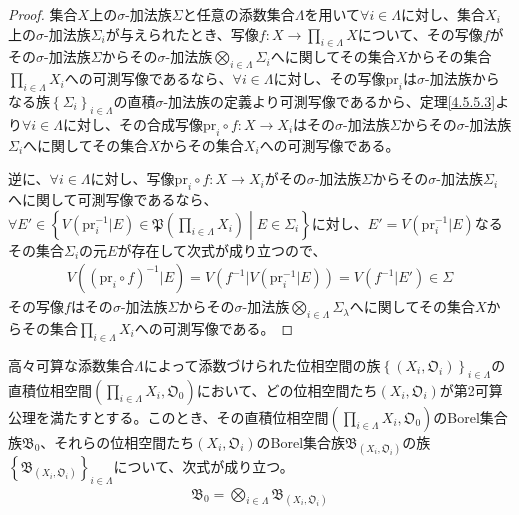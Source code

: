\documentclass[dvipdfmx]{jsarticle}
\begin{document}
\begin{proof}
集合$X$上の$\sigma$-加法族$\varSigma$と任意の添数集合$\varLambda$を用いて$\forall i \in \varLambda$に対し、集合$X_{i}$上の$\sigma$-加法族$\varSigma_{i}$が与えられたとき、写像$f:X \rightarrow \prod_{i \in \varLambda} X$について、その写像$f$がその$\sigma$-加法族$\varSigma$からその$\sigma$-加法族$\bigotimes_{i \in \varLambda} \varSigma_{i}$へに関してその集合$X$からその集合$\prod_{i \in \varLambda} X_{i}$への可測写像であるなら、$\forall i \in \varLambda$に対し、その写像$\mathrm{pr}_{i}$は$\sigma$-加法族からなる族$\left\{ \varSigma_{i} \right\}_{i \in \varLambda}$の直積$\sigma$-加法族の定義より可測写像であるから、定理\ref{4.5.5.3}より$\forall i \in \varLambda$に対し、その合成写像$\mathrm{pr}_{i} \circ f:X \rightarrow X_{i}$はその$\sigma$-加法族$\varSigma$からその$\sigma$-加法族$\varSigma_{i}$へに関してその集合$X$からその集合$X_{i}$への可測写像である。\par
逆に、$\forall i \in \varLambda$に対し、写像$\mathrm{pr}_{i} \circ f:X \rightarrow X_{i}$がその$\sigma$-加法族$\varSigma$からその$\sigma$-加法族$\varSigma_{i}$へに関して可測写像であるなら、$\forall E' \in \left\{ V\left( \mathrm{pr}_{i}^{- 1}|E \right)\in \mathfrak{P}\left( \prod_{i \in \varLambda} X_{i} \right) \middle| E \in \varSigma_{i} \right\}$に対し、$E' = V\left( \mathrm{pr}_{i}^{- 1}|E \right)$なるその集合$\varSigma_{i}$の元$E$が存在して次式が成り立つので、
\begin{align*}
V\left( \left( \mathrm{pr}_{i} \circ f \right)^{- 1}|E \right) = V\left( f^{- 1}|V\left( \mathrm{pr}_{i}^{- 1}|E \right) \right) = V\left( f^{- 1}|E' \right) \in \varSigma
\end{align*}
その写像$f$はその$\sigma$-加法族$\varSigma$からその$\sigma$-加法族$\bigotimes_{i \in \varLambda} \varSigma_{\lambda}$へに関してその集合$X$からその集合$\prod_{i \in \varLambda} X_{i}$への可測写像である。
\end{proof}
\begin{thm}\label{4.5.5.6}
高々可算な添数集合$\varLambda$によって添数づけられた位相空間の族$\left\{ \left( X_{i},\mathfrak{O}_{i} \right) \right\}_{i \in \varLambda }$の直積位相空間$\left( \prod_{i \in \varLambda } X_{i},\mathfrak{O}_{0} \right)$において、どの位相空間たち$\left( X_{i},\mathfrak{O}_{i} \right)$が第2可算公理を満たすとする。このとき、その直積位相空間$\left( \prod_{i \in \varLambda } X_{i},\mathfrak{O}_{0} \right)$のBorel集合族$\mathfrak{B}_{0}$、それらの位相空間たち$\left( X_{i},\mathfrak{O}_{i} \right)$のBorel集合族$\mathfrak{B}_{\left( X_{i},\mathfrak{O}_{i} \right)}$の族$\left\{ \mathfrak{B}_{\left( X_{i},\mathfrak{O}_{i} \right)} \right\}_{i \in \varLambda }$について、次式が成り立つ。
\begin{align*}
\mathfrak{B}_{0} = \bigotimes_{i \in \varLambda } \mathfrak{B}_{\left( X_{i},\mathfrak{O}_{i} \right)}
\end{align*}
\end{thm}
\end{document}
